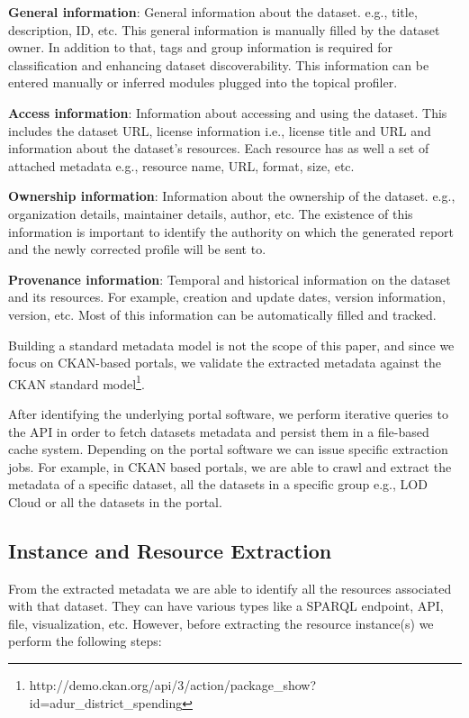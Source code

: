 \documentclass[runningheads,a4paper]{llncs}
\begin{document}
\textbf{General information}: General information about the dataset. e.g., title, description, ID, etc. This general information is manually filled by the dataset owner. In addition to that, tags and group information is required for classification and enhancing dataset discoverability. This information can be entered manually or inferred modules plugged into the topical profiler.

\textbf{Access information}: Information about accessing and using the dataset. This includes the dataset URL, license information i.e., license title and URL and information about the dataset's resources. Each resource has as well a set of attached metadata e.g., resource name, URL, format, size, etc.

\textbf{Ownership information}: Information about the ownership of the dataset. e.g., organization details, maintainer details, author, etc. The existence of this information is important to identify the authority on which the generated report and the newly corrected profile will be sent to.

\textbf{Provenance information}: Temporal and historical information on the dataset and its resources. For example, creation and update dates, version information, version, etc. Most of this information can be automatically filled and tracked.

Building a standard metadata model is not the scope of this paper, and since we focus on CKAN-based portals, we validate the extracted metadata against the CKAN standard model\footnote{http://demo.ckan.org/api/3/action/package\_show?id=adur\_district\_spending}.

After identifying the underlying portal software, we perform iterative queries to the API in order to fetch datasets metadata and persist them in a file-based cache system.
Depending on the portal software we can issue specific extraction jobs. For example, in CKAN based portals, we are able to crawl and extract the metadata of a specific dataset, all the datasets in a specific group e.g., LOD Cloud or all the datasets in the portal.

\subsection{Instance and Resource Extraction}

From the extracted metadata we are able to identify all the resources associated with that dataset. They can have various types like a SPARQL endpoint, API, file, visualization, etc. However, before extracting the resource instance(s) we perform the following steps:
\end{document}
